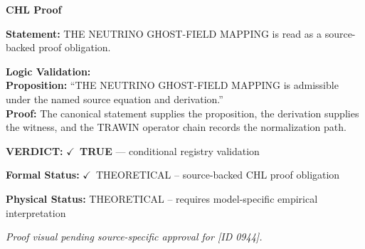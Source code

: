 \vspace{0.45em}
\noindent\textbf{CHL Proof}\par
\textbf{Statement:} THE NEUTRINO GHOST-FIELD MAPPING is read as a source-backed proof obligation.

\textbf{Logic Validation:}\\
\textbf{Proposition:} ``THE NEUTRINO GHOST-FIELD MAPPING is admissible under the named source equation and derivation.''\\
\textbf{Proof:} The canonical statement supplies the proposition, the derivation supplies the witness, and the TRAWIN operator chain records the normalization path.

\textbf{VERDICT:} \ensuremath{\checkmark}\ \textbf{TRUE} --- conditional registry validation

\textbf{Formal Status:} \ensuremath{\checkmark}\ THEORETICAL -- source-backed CHL proof obligation

\textbf{Physical Status:} THEORETICAL -- requires model-specific empirical interpretation
\par\vspace{0.45em}
\par
\vfill
\begingroup\footnotesize\itshape
Proof visual pending source-specific approval for [ID 0944].
\par\endgroup
\vfill
\endgroup
\endgroup
